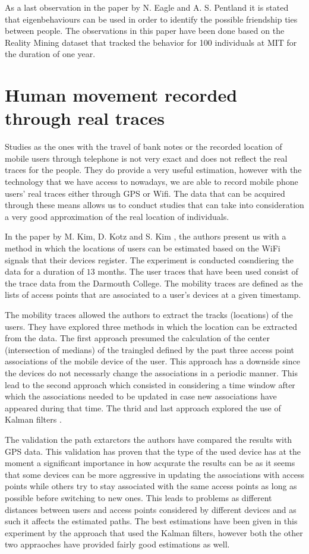 As a last observation in the paper by N. Eagle and A. S. Pentland it is stated
that eigenbehaviours can be used in order to identify the possible friendship
ties between people. The observations in this paper have been done based on the
Reality Mining dataset that tracked the behavior for 100 individuals at MIT for
the duration of one year.

\section{Human movement recorded through real traces}
Studies as the ones with the travel of bank notes or the recorded location of
mobile users through telephone is not very exact and does not reflect the real
traces for the people. They do provide a very useful estimation, however with
the technology that we have access to nowadays, we are able to record mobile
phone users' real traces either through GPS or Wifi. The data that can be
acquired through these means allows us to conduct studies that can take into
consideration a very good approximation of the real location of individuals.

In the paper by M. Kim, D. Kotz and S. Kim \cite{Kim06}, the authors present us
with a method in which the locations of users can be estimated based on the WiFi
signals that their devices register. The experiment is conducted cosndiering the
data for a duration of $13$ months. The user traces that have been used consist
of the trace data from the Darmouth College. The mobility traces are defined as
the lists of access points that are associated to a user's devices at a given
timestamp.

The mobility traces allowed the authors to extract the tracks (locations) of the
users. They have explored three methods in which the location can be extracted
from the data. The first approach presumed the calculation of the center
(intersection of medians) of the traingled defined by the past three access
point associations of the mobile device of the user. This approach has a
downside since the devices do not necessarly change the associations in a
periodic manner. This lead to the second approach which consisted in considering
a time window after which the associations needed to be updated in case new
associations have appeared during that time. The thrid and last approach
explored the use of Kalman filters \cite{KalmanFilter}.

The validation the path extarctors the authors have compared the results with
GPS data. This validation has proven that the type of the used device has at the
moment a significant importance in how acqurate the results can be as it seems
that some devices can be more aggressive in updating the associations with
access points while others try to stay associated with the same access points as
long as possible before switching to new ones. This leads to problems as
different distances between users and access points considered by different
devices and as such it affects the estimated paths. The best estimations have
been given in this experiment by the approach that used the Kalman filters,
however both the other two appraoches have provided fairly good estimations as
well.


